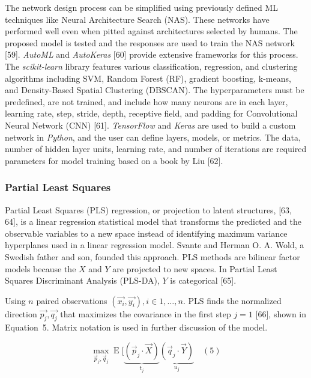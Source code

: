 \documentclass[sn-mathphys-num]{sn-jnl}%
\begin{document}
The network design process can be simplified using previously defined ML techniques like Neural Architecture Search (NAS). These networks have performed well even when pitted against architectures selected by humans. The proposed model is tested and the responses are used to train the NAS network [59]. \textit{AutoML} and \textit{AutoKeras} [60] provide extensive frameworks for this process. The \textit{scikit-learn} library features various classification, regression, and clustering algorithms including SVM, Random Forest (RF), gradient boosting, k-means, and Density-Based Spatial Clustering (DBSCAN). The hyperparameters must be predefined, are not trained, and include how many neurons are in each layer, learning rate, step, stride, depth, receptive field, and padding for Convolutional Neural Network (CNN) [61]. \textit{TensorFlow} and \textit{Keras} are used to build a custom network in \textit{Python}, and the user can define layers, models, or metrics. The data, number of hidden layer units, learning rate, and number of iterations are required parameters for model training based on a book by Liu [62].

\subsubsection{Partial Least Squares}

Partial Least Squares (PLS) regression, or projection to latent structures, [63, 64], is a linear regression statistical model that transforms the predicted and the observable variables to a new space instead of identifying maximum variance hyperplanes used in a linear regression model. Svante and Herman O. A. Wold, a Swedish father and son, founded this approach. PLS methods are bilinear factor models because the $X$ and $Y$ are projected to new spaces. In Partial Least Squares Discriminant Analysis (PLS-DA), $Y$ is categorical [65].

Using $n$ paired observations $\left(\vec{x_{i}}, \vec{y_{i}}\right), i \in 1, \dots, n$. PLS finds the normalized direction $\vec{p_{j}}, \vec{q_{j}}$ that maximizes the covariance in the first step $j = 1$ [66], shown in Equation~5. Matrix notation is used in further discussion of the model.

\begin{equation}
	\max_{{\vec{p}}_{j},{\vec{q}}_{j}}\operatorname{E} [\underbrace{({\vec{p}}_{j}\cdot {\vec{X}})}_{t_{j}}\underbrace{({\vec{q}}_{j}\cdot {\vec{Y}})}_{u_{j}}
	\quad\left(5\right)
\end{equation}
\end{document}

